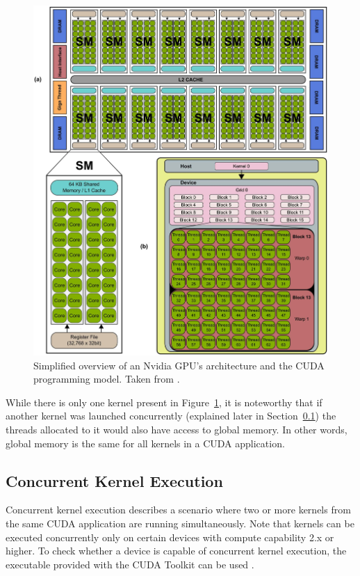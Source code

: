 \begin{figure}[ht!]
	\centering
	\includegraphics[width=\textwidth, keepaspectratio]{images/ch01/nvidia_gpu_architecture_and_cuda_structures.png}
	\caption{Simplified overview of an Nvidia GPU's architecture and the CUDA programming model.
		Taken from  \cite{Hernandez2015}.
	}
	\label{Figure:theory->CUDA->memory-management->nvidia-gpu-architecture-and-cuda-structures}
\end{figure}

While there is only one kernel present in Figure~\ref{Figure:theory->CUDA->memory-management->nvidia-gpu-architecture-and-cuda-structures}, it is noteworthy that if another kernel was launched concurrently (explained later in Section~\ref{Subsection:theory->CUDA->concurrent-kernel-execution}) the threads allocated to it would also have access to global memory.
In other words, global memory is the same for all kernels in a CUDA application.

\subsection{Concurrent Kernel Execution}\label{Subsection:theory->CUDA->concurrent-kernel-execution}
Concurrent kernel execution describes a scenario where two or more kernels from the same CUDA application are running simultaneously.
Note that kernels can be executed concurrently only on certain devices with compute capability 2.x or higher.
To check whether a device is capable of concurrent kernel execution, the  executable provided with the CUDA Toolkit can be used \cite{NVIDIADecember2022}.

